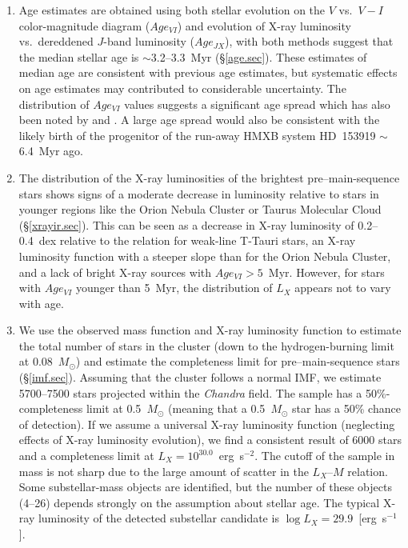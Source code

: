 \documentclass[twocolumn,tighten]{aastex61}
\begin{document}
\begin{enumerate}
\item Age estimates are obtained using both stellar evolution on the $V$ vs.\ $V-I$ color-magnitude diagram ($Age_{VI}$) and evolution of X-ray luminosity vs.\ dereddened $J$-band luminosity ($Age_{JX}$), with both methods suggest that the median stellar age is $\sim$3.2--3.3~Myr (\S\ref{age.sec}). These estimates of median age are consistent with previous age estimates, but systematic effects on age estimates may contributed to considerable uncertainty. The distribution of  $Age_{VI}$ values suggests a significant age spread which has also been noted by  and \citet{2013AJ....145...37S}. A large age spread would also be consistent with the likely birth of the progenitor of the run-away HMXB system HD~153919 $\sim$6.4~Myr ago.

\item The distribution of the X-ray luminosities of the brightest pre--main-sequence stars shows signs of a moderate decrease in luminosity  relative to stars in younger regions like the Orion Nebula Cluster or Taurus Molecular Cloud (\S\ref{xrayir.sec}). This can be seen as a decrease in X-ray luminosity of 0.2--0.4~dex relative to the \citet{2007A&A...468..425T} relation for weak-line T-Tauri stars, an X-ray luminosity function with a steeper slope than for the Orion Nebula Cluster, and a lack of bright X-ray sources with $Age_{VI}>5$~Myr. However, for stars with $Age_{VI}$ younger than 5~Myr, the distribution of $L_X$ appears  not to vary with age. 

\item We use the observed mass function and X-ray luminosity function to estimate the total number of stars in the cluster (down to the hydrogen-burning limit at 0.08~$M_\odot$) and estimate the completeness limit for pre--main-sequence stars (\S\ref{imf.sec}). Assuming that the cluster follows a normal IMF, we estimate 5700--7500 stars projected within the {\it Chandra} field. The sample has a 50\%-completeness limit at 0.5~$M_\odot$ (meaning that a 0.5~$M_\odot$ star has a 50\% chance of detection). If we assume a universal X-ray luminosity function (neglecting effects of X-ray luminosity evolution), we find a consistent result of 6000 stars and a completeness limit at $L_X=10^{30.0}$~erg~s$^{-2}$. The cutoff of the sample in mass is not sharp due to the large amount of scatter in the $L_X$--$M$ relation. Some substellar-mass objects are identified, but the number of these objects (4--26) depends strongly on the assumption about stellar age. The typical X-ray luminosity of the detected substellar candidate is $\log L_X=29.9$~[erg~s$^{-1}$]. 


\end{enumerate}
\end{document}
